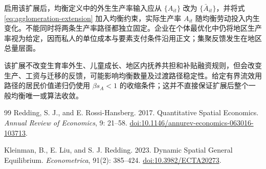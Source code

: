 \documentclass[UTF8,a4paper,zihao=-4,fontset=windows]{ctexart}
\numberwithin{equation}{section}
\begin{document}
启用该扩展后，均衡定义中的外生生产率输入应从 $\{A_{it}\}$ 改为 $\{\bar A_{it}\}$，并将式 \eqref{eq:agglomeration-extension} 加入均衡约束，实际生产率 $A_{it}$ 随均衡劳动投入内生变化。不能同时将两条生产率路径都独立固定。企业在个体最优化中仍将地区生产率视为给定，因而私人的单位成本与要素支付条件沿用正文；集聚反馈发生在地区总量层面。

该扩展不改变生育率外生、儿童成长、地区内抚养共担和补贴融资规则，但会改变生产、工资与迁移的反馈，可能影响均衡数量及过渡路径稳定性。给定有界流效用路径的居民价值递归仍使用 $\beta s_A<1$ 的收缩条件；这并不直接保证扩展后整个一般均衡唯一或算法收敛。

\clearpage
\begin{thebibliography}{99}
Redding, S. J., and E. Rossi-Hansberg. 2017.
Quantitative Spatial Economics.
\emph{Annual Review of Economics}, 9: 21--58.
\href{https://doi.org/10.1146/annurev-economics-063016-103713}{doi:10.1146/annurev-economics-063016-103713}.

Kleinman, B., E. Liu, and S. J. Redding. 2023.
Dynamic Spatial General Equilibrium.
\emph{Econometrica}, 91(2): 385--424.
\href{https://doi.org/10.3982/ECTA20273}{doi:10.3982/ECTA20273}.
\end{thebibliography}
\end{document}
